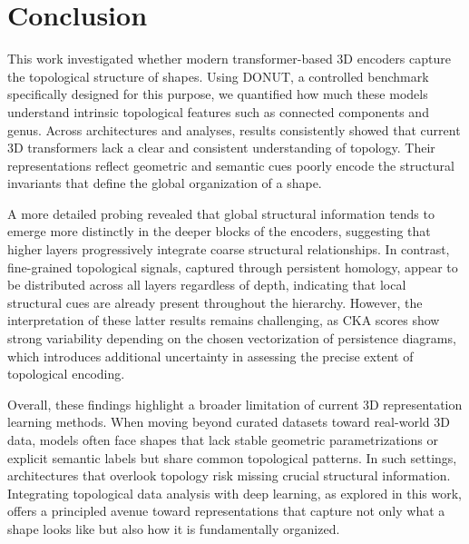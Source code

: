 \section{Conclusion}

This work investigated whether modern transformer-based 3D encoders capture the topological structure of shapes. Using DONUT, a controlled benchmark specifically designed for this purpose, we quantified how much these models understand intrinsic topological features such as connected components and genus. Across architectures and analyses, results consistently showed that current 3D transformers lack a clear and consistent understanding of topology. Their representations reflect geometric and semantic cues poorly encode the structural invariants that define the global organization of a shape.

A more detailed probing revealed that global structural information tends to emerge more distinctly in the deeper blocks of the encoders, suggesting that higher layers progressively integrate coarse structural relationships. In contrast, fine-grained topological signals, captured through persistent homology, appear to be distributed across all layers regardless of depth, indicating that local structural cues are already present throughout the hierarchy. However, the interpretation of these latter results remains challenging, as CKA scores show strong variability depending on the chosen vectorization of persistence diagrams, which introduces additional uncertainty in assessing the precise extent of topological encoding.

Overall, these findings highlight a broader limitation of current 3D representation learning methods. When moving beyond curated datasets toward real-world 3D data, models often face shapes that lack stable geometric parametrizations or explicit semantic labels but share common topological patterns. In such settings, architectures that overlook topology risk missing crucial structural information. Integrating topological data analysis with deep learning, as explored in this work, offers a principled avenue toward representations that capture not only what a shape looks like but also how it is fundamentally organized.